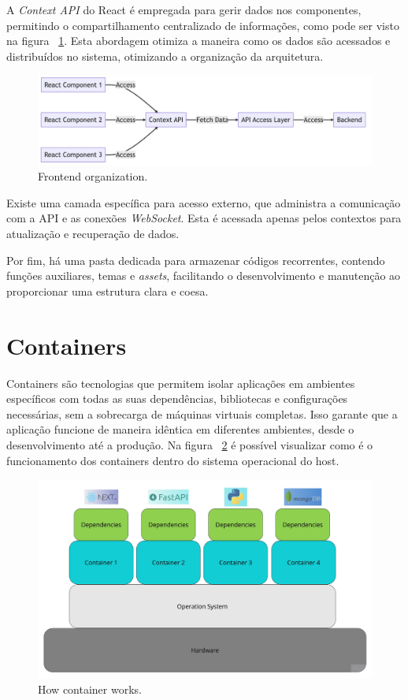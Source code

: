 A \textit{Context API} do React é empregada para gerir dados nos componentes, permitindo o compartilhamento centralizado de informações, como pode ser visto na figura ~\ref{fig:FrontendOrganization}. Esta abordagem otimiza a maneira como os dados são acessados e distribuídos no sistema, otimizando a organização da arquitetura.

\begin{figure}[htbp]
	\centering
	\includegraphics[width=\textwidth]{images/components_frontend.png}
	\caption{Frontend organization.}
	\label{fig:FrontendOrganization}
\end{figure}

Existe uma camada específica para acesso externo, que administra a comunicação com a \gls{API} e as conexões \textit{WebSocket}. Esta é acessada apenas pelos contextos para atualização e recuperação de dados.

Por fim, há uma pasta dedicada para armazenar códigos recorrentes, contendo funções auxiliares, temas e \textit{assets}, facilitando o desenvolvimento e manutenção ao proporcionar uma estrutura clara e coesa.


\section{Containers}

Containers são tecnologias que permitem isolar aplicações em ambientes específicos com todas as suas dependências, bibliotecas e configurações necessárias, sem a sobrecarga de máquinas virtuais completas. Isso garante que a aplicação funcione de maneira idêntica em diferentes ambientes, desde o desenvolvimento até a produção. Na figura ~\ref{fig:container} é possível visualizar como é o funcionamento dos containers dentro do sistema operacional do  host.

\begin{figure}[htbp]
	\centering
	\includegraphics[width=\textwidth]{images/container.jpg}
	\caption{How container works.}
	\label{fig:container}
\end{figure}

